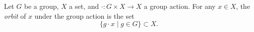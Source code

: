 \documentclass[12pt]{article}
\begin{document}
Let $G$ be a group, $X$ a set, and $\cdot: G \times X \longrightarrow X$ a group action. For any $x \in X$, the {\em orbit} of $x$ under the group action is the set
$$
\{g\cdot x \mid g \in G\} \subset X.
$$
\end{document}
